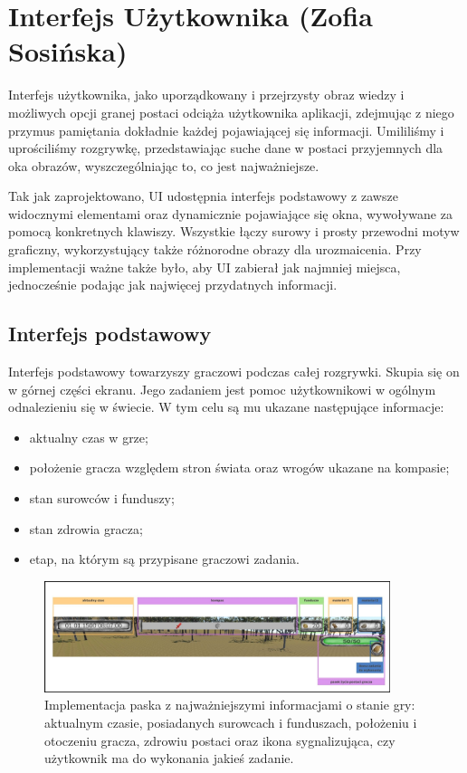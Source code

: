 \section{Interfejs Użytkownika (Zofia Sosińska)}\label{chap:ui_imp}
Interfejs użytkownika, jako uporządkowany i przejrzysty obraz wiedzy i możliwych opcji granej postaci odciąża użytkownika
aplikacji, zdejmując z niego przymus pamiętania dokładnie każdej pojawiającej się informacji. Umililiśmy i uprościliśmy 
rozgrywkę, przedstawiając suche dane w postaci przyjemnych dla oka obrazów, wyszczególniając to, co jest najważniejsze.

Tak jak zaprojektowano, UI udostępnia interfejs podstawowy z zawsze widocznymi elementami oraz dynamicznie pojawiające się okna, wywoływane za pomocą konkretnych klawiszy.
Wszystkie łączy surowy i prosty przewodni motyw graficzny, wykorzystujący także różnorodne obrazy dla urozmaicenia. Przy implementacji ważne także było, aby UI zabierał
jak najmniej miejsca, jednocześnie podając jak najwięcej przydatnych informacji.

\subsection{Interfejs podstawowy}
Interfejs podstawowy towarzyszy graczowi podczas całej rozgrywki. Skupia się on w górnej części ekranu. Jego zadaniem jest pomoc 
użytkownikowi w ogólnym odnalezieniu się w świecie. W tym celu są mu ukazane następujące informacje:
\begin{itemize}
    \item aktualny czas w grze;
    \item położenie gracza względem stron świata oraz wrogów ukazane na kompasie;
    \item stan surowców i funduszy;
    \item stan zdrowia gracza;
    \item etap, na którym są przypisane graczowi zadania.
\end{itemize}

\begin{figure}[htbp]
    \centering
    \includegraphics[width=0.9\textwidth]{images/ui/naszpasek.png}
    \caption{Implementacja paska z najważniejszymi informacjami o stanie gry: aktualnym czasie, posiadanych surowcach 
    i funduszach, położeniu i otoczeniu gracza, zdrowiu postaci oraz ikona sygnalizująca, czy użytkownik ma do wykonania jakieś zadanie.
    }\label{fig:naszpasek}
\end{figure}
\FloatBarrier

